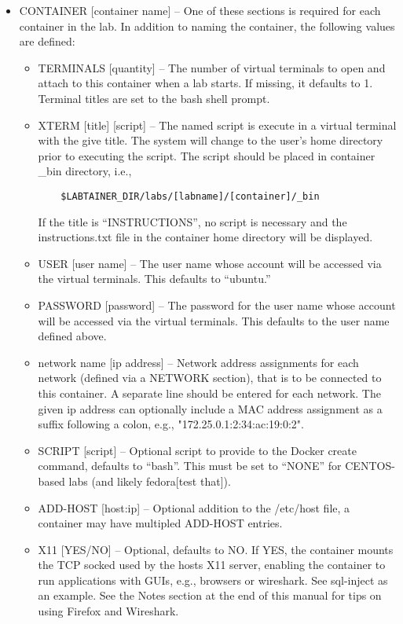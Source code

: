 \documentclass[12pt]{article}
\begin{document}
\begin{itemize}
\item CONTAINER [container name] -- One of these sections is required for each container in the lab.
In addition to naming the container, the following values are defined: 

\begin{itemize}
\item TERMINALS [quantity] -- The number of virtual terminals to open and attach to this 
container when a lab starts.  If missing, it defaults to 1. Terminal titles are set to the 
bash shell prompt.
\item XTERM [title] [script] -- The named script is execute in a virtual terminal with the
give title.   The system will change to the user's home directory prior to executing the
script.  The script should be placed in container \_bin directory, i.e.,
\begin{verbatim}
    $LABTAINER_DIR/labs/[labname]/[container]/_bin
\end{verbatim}
\noindent If the title is ``INSTRUCTIONS'', no script is necessary and the instructions.txt file
in the container home directory will be displayed.
\item USER [user name] -- The user name whose account will be accessed via the virtual terminals. 
This defaults to ``ubuntu.''
\item PASSWORD [password] -- The password for the user name whose account will be accessed via the virtual terminals. 
This defaults to the user name defined above.
\item network name [ip address] -- Network address assignments for each network (defined via a NETWORK section), 
that is to be connected to this container.  A separate line should be entered for each network.  The given ip address 
can optionally include a MAC address assignment as a suffix following a colon, e.g., "172.25.0.1:2:34:ac:19:0:2".
\item SCRIPT [script] -- Optional script to provide to the Docker create command, defaults to ``bash''.  This must be set to
``NONE'' for CENTOS-based labs (and likely fedora[test that]).
\item ADD-HOST [host:ip] -- Optional addition to the /etc/host file, a container may have multipled ADD-HOST entries.
\item X11 [YES/NO] -- Optional, defaults to NO.  If YES, the container mounts the TCP socked used by the hosts X11 server,
enabling the container to run applications with GUIs, e.g., browsers or wireshark.  See sql-inject as an example.  See the
Notes section at the end of this manual for tips on using Firefox and Wireshark.

\end{itemize}
\end{itemize}
  
\end{document}
